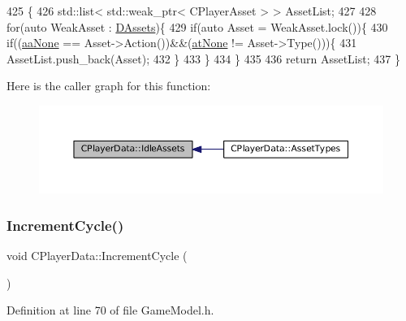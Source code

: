 \begin{DoxyCode}
425                                                                     \{
426     std::list< std::weak\_ptr< CPlayerAsset > > AssetList;
427     
428     \textcolor{keywordflow}{for}(\textcolor{keyword}{auto} WeakAsset : \hyperlink{classCPlayerData_a1d7dd355facf52db6242e3554373906c}{DAssets})\{
429         \textcolor{keywordflow}{if}(\textcolor{keyword}{auto} Asset = WeakAsset.lock())\{
430             \textcolor{keywordflow}{if}((\hyperlink{GameDataTypes_8h_ab47668e651a3032cfb9c40ea2d60d670ac17cc5a0035320c060d7f8074143b507}{aaNone} == Asset->Action())&&(\hyperlink{GameDataTypes_8h_a5600d4fc433b83300308921974477feca82fb51718e2c00981a2d37bc6fe92593}{atNone} != Asset->Type()))\{
431                 AssetList.push\_back(Asset);
432             \}
433         \}
434     \}
435     
436     \textcolor{keywordflow}{return} AssetList;
437 \}
\end{DoxyCode}
Here is the caller graph for this function\+:\nopagebreak
\begin{figure}[H]
\begin{center}
\leavevmode
\includegraphics[width=350pt]{classCPlayerData_a5bd2ebe2e3dc25669bb312226e087fd1_icgraph}
\end{center}
\end{figure}
\hypertarget{classCPlayerData_a6fbfd47b568e721df80644689f8dd172}{}\label{classCPlayerData_a6fbfd47b568e721df80644689f8dd172} 
\subsubsection{\texorpdfstring{Increment\+Cycle()}{IncrementCycle()}}
{\footnotesize\ttfamily void C\+Player\+Data\+::\+Increment\+Cycle (\begin{DoxyParamCaption}{ }\end{DoxyParamCaption})\hspace{0.3cm}{\ttfamily [inline]}}



Definition at line 70 of file Game\+Model.\+h.


